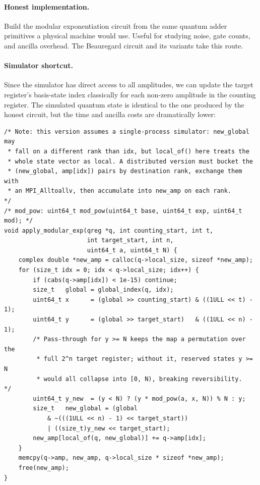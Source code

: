 \paragraph{Honest implementation.}
Build the modular exponentiation circuit from the same quantum adder primitives a physical machine would use. Useful for studying noise, gate counts, and ancilla overhead. The Beauregard circuit and its variants take this route.

\paragraph{Simulator shortcut.} Since the simulator has direct access to all amplitudes, we can update the target register's basis-state index classically for each non-zero amplitude in the counting register. The simulated quantum state is identical to the one produced by the honest circuit, but the time and ancilla costs are dramatically lower:

\begin{lstlisting}[caption={Modular exponentiation, single-process simulator shortcut. Iterates over basis states, classically computes $a^x \bmod N$, and rewrites the target register. See note below for the distributed case.}]
/* Note: this version assumes a single-process simulator: new_global may
 * fall on a different rank than idx, but local_of() here treats the
 * whole state vector as local. A distributed version must bucket the
 * (new_global, amp[idx]) pairs by destination rank, exchange them with
 * an MPI_Alltoallv, then accumulate into new_amp on each rank.       */
/* mod_pow: uint64_t mod_pow(uint64_t base, uint64_t exp, uint64_t mod); */
void apply_modular_exp(qreg *q, int counting_start, int t,
                       int target_start, int n,
                       uint64_t a, uint64_t N) {
    complex double *new_amp = calloc(q->local_size, sizeof *new_amp);
    for (size_t idx = 0; idx < q->local_size; idx++) {
        if (cabs(q->amp[idx]) < 1e-15) continue;
        size_t   global = global_index(q, idx);
        uint64_t x      = (global >> counting_start) & ((1ULL << t) - 1);
        uint64_t y      = (global >> target_start)   & ((1ULL << n) - 1);
        /* Pass-through for y >= N keeps the map a permutation over the
         * full 2^n target register; without it, reserved states y >= N
         * would all collapse into [0, N), breaking reversibility.    */
        uint64_t y_new  = (y < N) ? (y * mod_pow(a, x, N)) % N : y;
        size_t   new_global = (global
            & ~(((1ULL << n) - 1) << target_start))
            | ((size_t)y_new << target_start);
        new_amp[local_of(q, new_global)] += q->amp[idx];
    }
    memcpy(q->amp, new_amp, q->local_size * sizeof *new_amp);
    free(new_amp);
}
\end{lstlisting}

